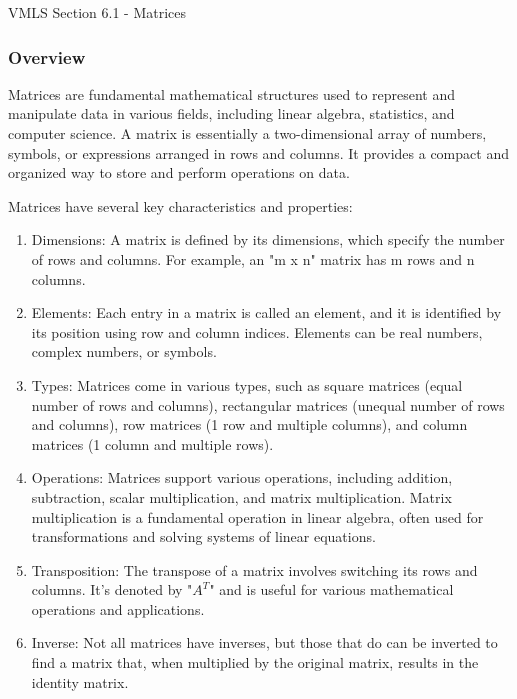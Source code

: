 \begin{notes}{VMLS Section 6.1 - Matrices}
    \subsubsection*{Overview}

    Matrices are fundamental mathematical structures used to represent and manipulate data in various fields, including linear algebra, statistics, and computer science. A matrix is essentially a 
    two-dimensional array of numbers, symbols, or expressions arranged in rows and columns. It provides a compact and organized way to store and perform operations on data.

    Matrices have several key characteristics and properties:

    \begin{enumerate}
        \item Dimensions: A matrix is defined by its dimensions, which specify the number of rows and columns. For example, an "m x n" matrix has m rows and n columns.

        \item Elements: Each entry in a matrix is called an element, and it is identified by its position using row and column indices. Elements can be real numbers, complex numbers, or symbols.

        \item Types: Matrices come in various types, such as square matrices (equal number of rows and columns), rectangular matrices (unequal number of rows and columns), row matrices (1 row and 
        multiple columns), and column matrices (1 column and multiple rows).

        \item Operations: Matrices support various operations, including addition, subtraction, scalar multiplication, and matrix multiplication. Matrix multiplication is a fundamental operation in 
        linear algebra, often used for transformations and solving systems of linear equations.

        \item Transposition: The transpose of a matrix involves switching its rows and columns. It's denoted by "$A^{T}$" and is useful for various mathematical operations and applications.

        \item Inverse: Not all matrices have inverses, but those that do can be inverted to find a matrix that, when multiplied by the original matrix, results in the identity matrix.


\end{enumerate}
\end{notes}
